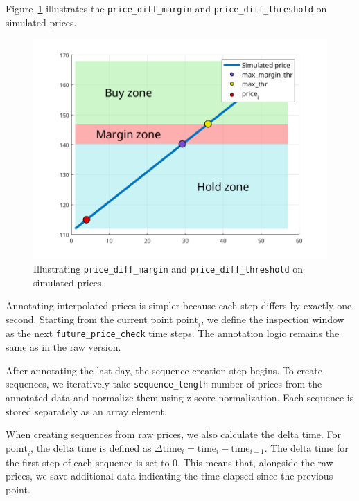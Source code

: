 \documentclass[a4paper,oneside,onecolumn,12pt]{book}
\begin{document}
		Figure~\ref{fig:margin_thr} illustrates the \texttt{price\_diff\_margin} and \texttt{price\_diff\_threshold} on simulated prices.
		\begin{figure}[H]
		\begin{center}
			\includegraphics[width=12cm]{kep/margin_thr.png}
			\caption{Illustrating \texttt{price\_diff\_margin} and \texttt{price\_diff\_threshold} on simulated prices.}
			\label{fig:margin_thr}
		\end{center}
		\end{figure}

		Annotating interpolated prices is simpler because each step differs by exactly one second. Starting from the current point $\text{point}_i$, we define the inspection window as the next \texttt{future\_price\_check} time steps. The annotation logic remains the same as in the raw version.

		After annotating the last day, the sequence creation step begins. To create sequences, we iteratively take \texttt{sequence\_length} number of prices from the annotated data and normalize them using z-score normalization. Each sequence is stored separately as an array element.

		When creating sequences from raw prices, we also calculate the delta time. For $\text{point}_i$, the delta time is defined as $\Delta\text{time}_i = \text{time}_i - \text{time}_{i-1}$. The delta time for the first step of each sequence is set to 0. This means that, alongside the raw prices, we save additional data indicating the time elapsed since the previous point. 
\end{document}
